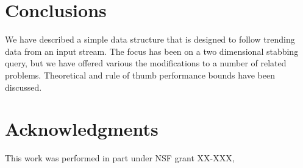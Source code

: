 \documentclass{sig-alternate}
\begin{document}
\section{Conclusions}
\label{sec:conclusions}

We have described a simple data structure that is designed to follow
trending data from an input stream.  The focus has been on a two
dimensional stabbing query, but we have offered various the
modifications to a number of related problems.  Theoretical and rule
of thumb performance bounds have been discussed.

\section{Acknowledgments}
This work was performed in part under NSF grant  XX-XXX, 



\balancecolumns
\end{document}
